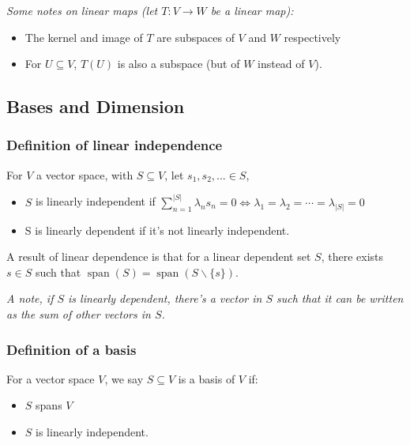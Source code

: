 \documentclass[a4paper, 12pt, twoside]{article}
\DeclareMathOperator{\Spa}{span}
\begin{document}
\textit{Some notes on linear maps (let $T: V \to W$ be a linear map):}

\begin{itemize}
  \item The kernel and image of $T$ are subspaces of $V$ and $W$ respectively
  \item For $U \subseteq V$, $T(U)$ is also a subspace (but of $W$ instead of $V$).
\end{itemize}

\subsection{Bases and Dimension}

\subsubsection{Definition of linear independence}

For $V$ a vector space, with $S \subseteq V$, let $s_1, s_2, ... \in S$,

\begin{itemize}
  \item $S$ is linearly independent if $\sum_{n = 1}^{|S|} \lambda_n s_n = 0
          \Longleftrightarrow \lambda_1 = \lambda_2 = \cdots = \lambda_{|S|} = 0$
  \item S is linearly dependent if it's not linearly independent.
\end{itemize}

A result of linear dependence is that for a linear dependent set $S$, there
exists $s \in S$ such that $\Spa(S) = \Spa(S\backslash\{s\})$.

\vspace{\baselineskip}

\textit{A note, if $S$ is linearly dependent, there's a vector in $S$ such
  that it can be written as the sum of other vectors in $S$.}

\subsubsection{Definition of a basis}

For a vector space $V$, we say $S \subseteq V$ is a basis of $V$ if:
\begin{itemize}
  \item $S$ spans $V$
  \item $S$ is linearly independent.
\end{itemize}
\end{document}
